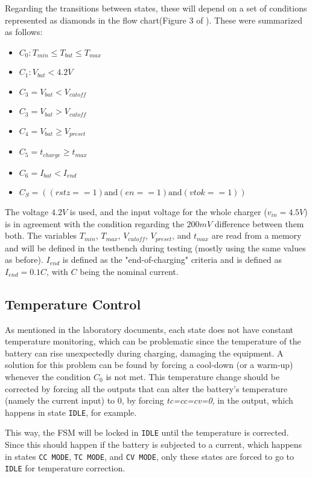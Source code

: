 \documentclass[12pt]{article}
\begin{document}
Regarding the transitions between states, these will depend on a set of conditions represented as diamonds in the flow chart(Figure 3 of \cite{batchargerPaper}). These were summarized as follows: 
\begin{itemize}
    \item $C_0: T_{min}\leq T_{bat}\leq T_{max}$
    \item $C_1: V_{bat}<4.2V$
    \item $C_3=V_{bat}<V_{cutoff}$
    \item $C_3=V_{bat}>V_{cutoff}$
    \item $C_4=V_{bat}\geq V_{preset}$
    \item $C_5=t_{charge}\geq t_{max}$
    \item $C_{6}=I_{bat}<I_{end}$
    \item $C_{S}=((rstz==1) \text{and} (en==1) \text{and} (vtok==1))$
\end{itemize}

The voltage $4.2V$ is used, and the input voltage for the whole charger ($v_{in}=4.5V$) is in agreement with the condition regarding the $200mV$ difference between them both. The variables $T_{min}$, $T_{max}$, $V_{cutoff}$, $V_{preset}$, and $t_{max}$ are read from a memory and will be defined in the testbench during testing (mostly using the same values as before). $I_{end}$ is defined as the "end-of-charging" criteria and is defined as $I_{end}=0.1C$, with $C$ being the nominal current. 

\subsection{Temperature Control}

As mentioned in the laboratory documents, each state does not have constant temperature monitoring, which can be problematic since the temperature of the battery can rise unexpectedly during charging, damaging the equipment. A solution for this problem can be found by forcing a cool-down (or a warm-up) whenever the condition $C_0$ is not met. This temperature change should be corrected by forcing all the outputs that can alter the battery's temperature (namely the current input) to $0$, by forcing \textit{tc=cc=cv=0}, in the output, which happens in state \texttt{IDLE}, for example. 

This way, the FSM will be locked in \texttt{IDLE} until the temperature is corrected. Since this should happen if the battery is subjected to a current, which happens in states \texttt{CC MODE}, \texttt{TC MODE}, and \texttt{CV MODE}, only these states are forced to go to \texttt{IDLE} for temperature correction. 
\end{document}
